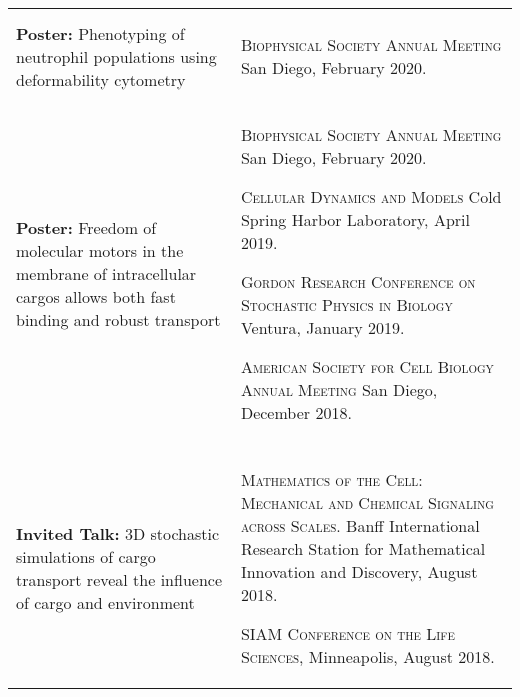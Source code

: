 \documentclass[letterpaper,10pt]{article} %
\makeatletter
\newcommand\cellwidth{\TX@col@width}
\makeatother
\begin{document}
\begin{tabularx}{\textwidth}{p{} | X}
\multicolumn{2}{c}{} \\

\begin{minipage}{.4\textwidth}
\textbf{Poster:} Phenotyping of neutrophil populations using deformability cytometry
\end{minipage}
&
\begin{minipage}{\cellwidth}
\begin{description}[itemsep=.25ex,labelsep=0em]
\item \textsc{Biophysical Society Annual Meeting} San Diego, February 2020.
\end{description}
\end{minipage} \\

\multicolumn{2}{c}{} \\

\begin{minipage}{.4\textwidth}
\textbf{Poster:} Freedom of molecular motors in the membrane of intracellular cargos allows both fast binding and robust transport
\end{minipage}
&
\begin{minipage}{\cellwidth}
\begin{description}[itemsep=.25ex,labelsep=0em]
\item \textsc{Biophysical Society Annual Meeting} San Diego, February 2020.
\item \textsc{Cellular Dynamics and Models} Cold Spring Harbor Laboratory, April 2019.
\item \textsc{Gordon Research Conference on Stochastic Physics in Biology} Ventura, January 2019.
\item \textsc{American Society for Cell Biology Annual Meeting} San Diego, December 2018.
\end{description}
\end{minipage} \\

\multicolumn{2}{c}{} \\

\begin{minipage}{.4\textwidth}
\textbf{Invited Talk:} 3D stochastic simulations of cargo transport reveal the influence of cargo and environment
\end{minipage}
&
\begin{minipage}{\cellwidth}
\begin{description}[itemsep=.25ex,labelsep=0em]
\item \textsc{Mathematics of the Cell: Mechanical and Chemical Signaling across Scales.} Banff International Research Station for Mathematical Innovation and Discovery, August 2018.
\item \textsc{SIAM Conference on the Life Sciences}, Minneapolis, August 2018.
\end{description}
\end{minipage} \\


\end{tabularx}
\end{document}
